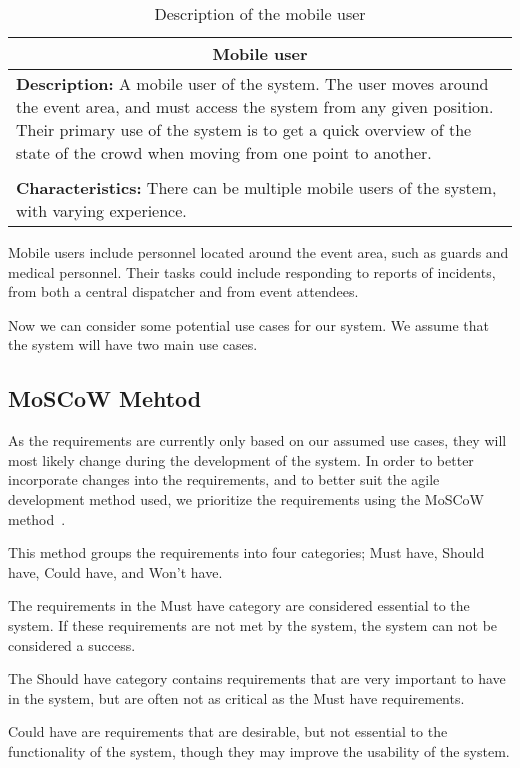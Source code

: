 \begin{table}[h!]
    \centering
    \begin{tabularx}{/8}{X}
        \toprule
        \multicolumn{1}{c}{\textbf{Mobile user}} \\ 
        \midrule
        \textbf{Description:} A mobile user of the system. The user moves around the event area, and must access the system from any given position. Their primary use of the system is to get a quick overview of the state of the crowd when moving from one point to another. \\
        \\
        \textbf{Characteristics:} There can be multiple mobile users of the system, with varying experience. \\
        \bottomrule
    \end{tabularx}
    \caption{Description of the mobile user}
    \label{tab:mob_user}
\end{table}

Mobile users include personnel located around the event area, such as guards and medical personnel. Their tasks could include responding to reports of incidents, from both a central dispatcher and from event attendees.

Now we can consider some potential use cases for our system. We assume that the system will have two main use cases. 

\subsection{MoSCoW Mehtod}
As the requirements are currently only based on our assumed use cases, they will most likely change during the development of the system. In order to better incorporate changes into the requirements, and to better suit the agile development method used, we prioritize the requirements using the MoSCoW method~\cite{moscow}.

This method groups the requirements into four categories; Must have, Should have, Could have, and Won't have. 

The requirements in the Must have category are considered essential to the system. If these requirements are not met by the system, the system can not be considered a success. 

The Should have category contains requirements that are very important to have in the system, but are often not as critical as the Must have requirements. 

Could have are requirements that are desirable, but not essential to the functionality of the system, though they may improve the usability of the system. 

